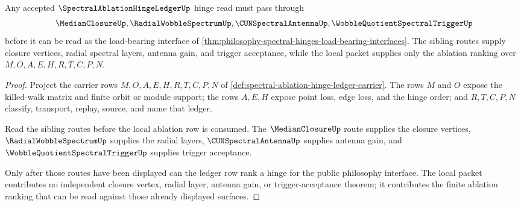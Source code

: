 \begin{theorem}
\label{thm:spectral-ablation-hinge-vision-route}
Any accepted $\SpectralAblationHingeLedgerUp$ hinge read must pass through
$$
\MedianClosureUp,\RadialWobbleSpectrumUp,\CUNSpectralAntennaUp,\WobbleQuotientSpectralTriggerUp
$$
before it can be read as the load-bearing interface of \autoref{thm:philosophy-spectral-hinges-load-bearing-interfaces}. The sibling routes supply closure vertices, radial spectral layers, antenna gain, and trigger acceptance, while the local packet supplies only the ablation ranking over $M,O,A,E,H,R,T,C,P,N$.
\end{theorem}
\begin{proof}
Project the carrier rows $M,O,A,E,H,R,T,C,P,N$ of \autoref{def:spectral-ablation-hinge-ledger-carrier}. The rows $M$ and $O$ expose the killed-walk matrix and finite orbit or module support; the rows $A,E,H$ expose point loss, edge loss, and the hinge order; and $R,T,C,P,N$ classify, transport, replay, source, and name that ledger.

Read the sibling routes before the local ablation row is consumed. The $\MedianClosureUp$ route supplies the closure vertices, $\RadialWobbleSpectrumUp$ supplies the radial layers, $\CUNSpectralAntennaUp$ supplies antenna gain, and $\WobbleQuotientSpectralTriggerUp$ supplies trigger acceptance.

Only after those routes have been displayed can the ledger row rank a hinge for the public philosophy interface. The local packet contributes no independent closure vertex, radial layer, antenna gain, or trigger-acceptance theorem; it contributes the finite ablation ranking that can be read against those already displayed surfaces.
\end{proof}


\begin{closurestatus}{\SpectralAblationHingeLedgerUp}
  \theoryclosure{\seedClosure}
  \formalstatus{\unformalizedV}
\end{closurestatus}
